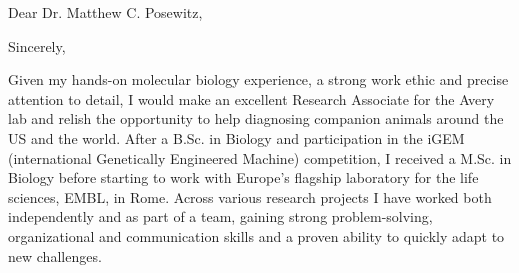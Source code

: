 \documentclass[11pt,a4paper,sans]{moderncv}
\begin{document}
\thispagestyle{titlepage}
\date{\today}
\opening{Dear Dr. Matthew C. Posewitz,}
\closing{Sincerely,}
\makelettertitle
\begin{spacing}{1.1}

Given my hands-on molecular biology experience, a strong work ethic and precise attention to detail, I would make an excellent Research Associate for the Avery lab and relish the opportunity to help diagnosing companion animals around the US and the world. 
After a B.Sc. in Biology and participation in the iGEM (international Genetically Engineered Machine) competition, I received a M.Sc. in Biology before starting to work with Europe's flagship laboratory for the life sciences, EMBL, in Rome. 
Across various research projects I have worked both independently and as part of a team, gaining strong problem-solving, organizational and communication skills and a proven ability to quickly adapt to new challenges.
\par%


\end{spacing}
\end{document}
